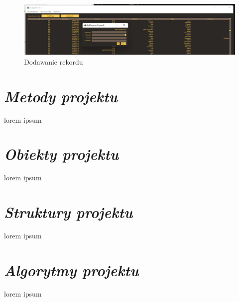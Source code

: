 \documentclass[a4paper,10pt, twoside]{report}
\newcommand{\customstylesection}[1]{\textbf{\textit{#1}}}
\begin{document}
\begin{figure}[H]           %
    \caption{Dodawanie rekordu}
    \label{fig:Dodawanie rekordu}
    \centering  
    \includegraphics[width=12cm]{figures/Interface_Browse_AddRecord_v0.3.png}
\end{figure}

\section{\customstylesection{Metody projektu}} 
\label{Metody projektu}
{lorem ipsum}

\section{\customstylesection{Obiekty projektu}}
{lorem ipsum}

\section{\customstylesection{Struktury projektu}}
{lorem ipsum}

\section{\customstylesection{Algorytmy projektu}}
{lorem ipsum}
\end{document}
